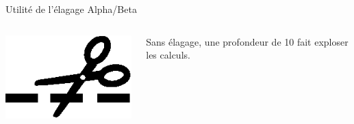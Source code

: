 \documentclass[compress, 12pt]{beamer}
\begin{document}
\begin{frame}{Utilité de l'élagage Alpha/Beta}
    \begin{columns}
        \begin{column}{.2\textwidth}
            \includegraphics[width=1.3\textwidth]{./pix/sym_cut}
        \end{column}
        \begin{column}{.6\textwidth}
            \begin{center}
                Sans élagage, une profondeur de 10 fait exploser les calculs.
            \end{center}
        \end{column}
    \end{columns}
\end{frame}
\end{document}
